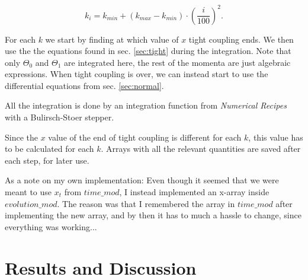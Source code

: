 \documentclass[a4paper,norsk, 10pt]{article}
\begin{document}
\begin{equation}
k_i = k_{min} + (k_{max}-k_{min})\cdot\left(\frac{i}{100}\right)^2.
\end{equation}

For each $k$ we start by finding at which value of $x$ tight coupling ends. We then use the the equations found in sec. \ref{sec:tight} during the integration. Note that only $\Theta_0$ and $\Theta_1$ are integrated here, the rest of the momenta are just algebraic expressions. When tight coupling is over, we can instead start to use the differential equations from sec. \ref{sec:normal}. 

All the integration is done by an integration function from \textit{Numerical Recipes} with a Bulirsch-Stoer stepper.

Since the $x$ value of the end of tight coupling is different for each $k$, this value has to be calculated for each $k$. Arrays with all the relevant quantities are saved after each step, for later use.

As a note on my own implementation: Even though it seemed that we were meant to use $x_t$ from $time\_mod$, I instead implemented an x-array inside $evolution\_mod$. The reason was that I remembered the array in $time\_mod$ after implementing the new array, and by then it has to much a hassle to change, since everything was working...

\section{Results and Discussion}
\end{document}

